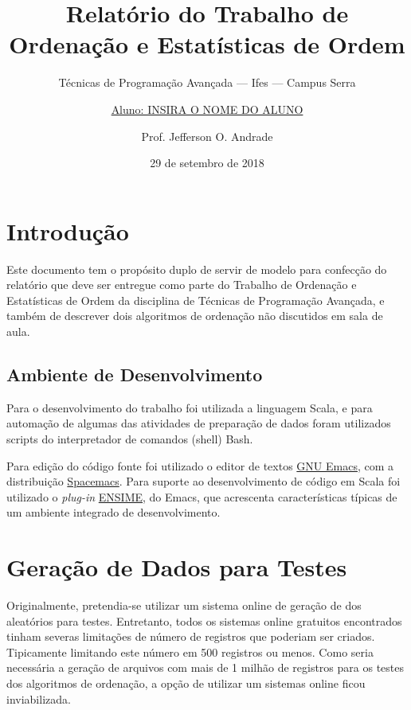 \documentclass[a4paper,12pt]{scrartcl}
\title{Relatório do Trabalho de Ordenação e Estatísticas de Ordem}
\subtitle{Técnicas de Programação Avançada --- Ifes --- Campus Serra}
\author{\uline{Aluno: INSIRA O NOME DO ALUNO}%
  \and Prof. Jefferson O. Andrade}
\date{29 de setembro de 2018}
\begin{document}
\maketitle

\tableofcontents

\listoflistings

\listoffigures


\section{Introdução}
\label{sec:introducao}

Este documento tem o propósito duplo de servir de modelo para confecção do
relatório que deve ser entregue como parte do Trabalho de Ordenação e
Estatísticas de Ordem da disciplina de Técnicas de Programação Avançada, e
também de descrever dois algoritmos de ordenação não discutidos em sala de aula.


\subsection{Ambiente de Desenvolvimento}
\label{sec:amb-desenv}

Para o desenvolvimento do trabalho foi utilizada a linguagem Scala, e para
automação de algumas das atividades de preparação de dados foram utilizados
scripts do interpretador de comandos (shell) Bash.

Para edição do código fonte foi utilizado o editor de textos
\href{https://www.gnu.org/software/emacs/}{GNU Emacs}, com a distribuição
\href{http://spacemacs.org/}{Spacemacs}. Para suporte ao desenvolvimento de
código em Scala foi utilizado o \emph{plug-in}
\href{https://ensime.github.io/}{ENSIME}, do Emacs, que acrescenta
características típicas de um ambiente integrado de desenvolvimento.


\section{Geração de Dados para Testes}
\label{sec:geracao-de-dados}

Originalmente, pretendia-se utilizar um sistema online de geração de dos
aleatórios para testes. Entretanto, todos os sistemas online gratuitos
encontrados tinham severas limitações de número de registros que poderiam ser
criados. Tipicamente limitando este número em 500 registros ou menos. Como seria
necessária a geração de arquivos com mais de 1 milhão de registros para os
testes dos algoritmos de ordenação, a opção de utilizar um sistemas online ficou
inviabilizada.
\end{document}
